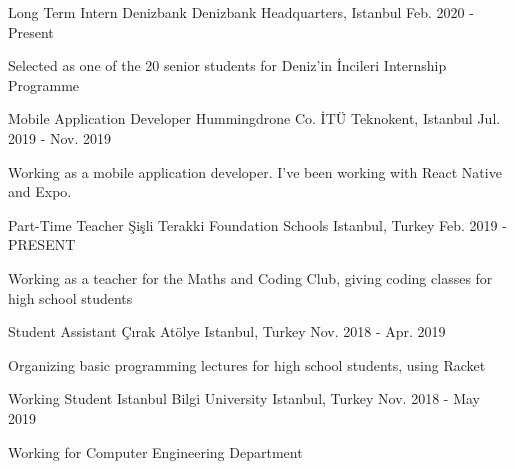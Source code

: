 

\begin{cventries}
\cventry
{Long Term Intern} %
{Denizbank} %
{Denizbank Headquarters, Istanbul} %
{Feb. 2020 - Present} %
{ %
\begin{cvitems}
\item {Selected as one of the 20 senior students for Deniz'in İncileri Internship Programme}
\end{cvitems}
}


\cventry
{Mobile Application Developer} %
{Hummingdrone Co.} %
{İTÜ Teknokent, Istanbul} %
{Jul. 2019 - Nov. 2019} %
{ %
\begin{cvitems}
\item {Working as a mobile application developer. I've been working with React Native and Expo.}
\end{cvitems}
}


\cventry
{Part-Time Teacher} %
{Şişli Terakki Foundation Schools} %
{Istanbul, Turkey} %
{Feb. 2019 - PRESENT} %
{ %
\begin{cvitems}
\item {Working as a teacher for the Maths and Coding Club, giving coding classes for high school students}
\end{cvitems}
}


\cventry
{Student Assistant} %
{Çırak Atölye} %
{Istanbul, Turkey} %
{Nov. 2018 - Apr. 2019} %
{ %
\begin{cvitems}
\item {Organizing basic programming lectures for high school students, using Racket}
\end{cvitems}
}


\cventry
{Working Student} %
{Istanbul Bilgi University} %
{Istanbul, Turkey} %
{Nov. 2018 - May 2019} %
{ %
\begin{cvitems}
\item {Working for Computer Engineering Department}
\end{cvitems}
}

\end{cventries}